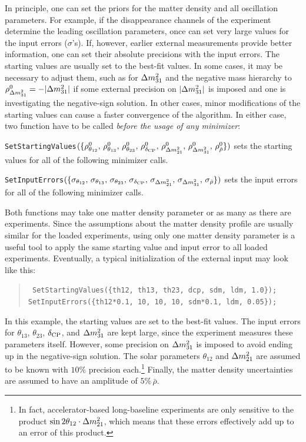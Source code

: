 In principle, one can set the priors for the matter density and all oscillation parameters. For example, if the disappearance channels of the experiment determine the leading oscillation parameters, once can set very large values for the input errors ($\sigma$'s). If, however, earlier external measurements provide better information, one can set their absolute precisions with the input errors. The starting values are usually set to the best-fit values. In some cases, it may be necessary to adjust them, such as for $\Delta m_{31}^2$ and the negative mass hierarchy to $\rho^0_{\Delta m_{31}^2} = - |\Delta m_{31}^2|$ if some external precision on $| \Delta m_{31}^2 |$ is imposed and one is investigating the negative-sign solution. In other cases, minor modifications of the starting values can cause a faster convergence of the algorithm.
In either case, two function have to be called {\em before the usage of any minimizer}:
\begin{function}
{\tt SetStartingValues}$(\{\rho^0_{\theta_{12}}, \, \rho^0_{\theta_{13}}, \, \rho^0_{\theta_{23}}, \, \rho^0_{\delta_{\mathrm{CP}}}, \, \rho^0_{\Delta m_{21}^2}, \, \rho^0_{\Delta m_{31}^2}, \, \rho^0_{\hat\rho} \})$ sets the starting values for all of the following minimizer calls.
\end{function}
\begin{function}
{\tt SetInputErrors}$(\{\sigma_{\theta_{12}}, \, \sigma_{\theta_{13}}, \, \sigma_{\theta_{23}}, \, \sigma_{\delta_{\mathrm{CP}}}, \, \sigma_{\Delta m_{21}^2}, \, \sigma_{\Delta m_{31}^2}, \, \sigma_{\hat\rho} \})$ sets the input errors for all of the following minimizer calls.
\end{function}
Both functions may take one matter density parameter or as many as there are experiments. Since the assumptions about the matter density profile are usually similar for the loaded experiments, using only one matter density parameter is a useful tool to apply the same starting value  and input error to all loaded experiments.
Eventually, a typical initialization of the external input may look like this:
\begin{quote}
{\tt
SetStartingValues(\{th12, th13, th23, dcp, sdm, ldm, 1.0\}); \\
SetInputErrors(\{th12*0.1, 10, 10, 10, sdm*0.1, ldm, 0.05\}); 
}
\end{quote}
In this example, the starting values are set to the best-fit values. The input errors for $\theta_{13}$, $\theta_{23}$, $\delta_{\mathrm{CP}}$, and $\Delta m_{31}^2$ are kept large, since the experiment measures these parameters itself. However, some precision on $\Delta m_{31}^2$ is imposed to avoid ending up in the negative-sign solution. The solar parameters $\theta_{12}$ and $\Delta m_{21}^2$ are assumed to be known with $10\%$ precision each.\footnote{In fact, accelerator-based long-baseline experiments are only sensitive to the product $\sin 2 \theta_{12} \cdot \Delta m_{21}^2$, which means that these errors effectively add up to an error of this product.} Finally, the matter density uncertainties are assumed to have an amplitude of $5\% \,  \bar\rho$.
 
